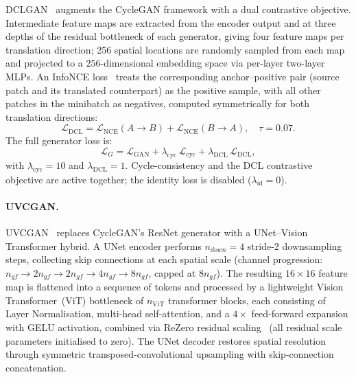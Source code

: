DCLGAN~\cite{han2021dual} augments the CycleGAN framework with a dual contrastive
objective.
Intermediate feature maps are extracted from the encoder output and at three depths of
the residual bottleneck of each generator, giving four feature maps per translation
direction; 256 spatial locations are randomly sampled from each map and projected to a
$256$-dimensional embedding space via per-layer two-layer MLPs.
An InfoNCE loss~\cite{oord2018representation} treats the corresponding anchor--positive
pair (source patch and its translated counterpart) as the positive sample, with all
other patches in the minibatch as negatives, computed symmetrically for both translation
directions:
\begin{equation}
  \mathcal{L}_{\text{DCL}} =
    \mathcal{L}_{\text{NCE}}(A{\to}B) + \mathcal{L}_{\text{NCE}}(B{\to}A),
    \quad \tau{=}0.07.
\end{equation}
The full generator loss is:
\begin{equation}
  \mathcal{L}_G = \mathcal{L}_{\text{GAN}} +
    \lambda_{\text{cyc}}\,\mathcal{L}_{\text{cyc}} +
    \lambda_{\text{DCL}}\,\mathcal{L}_{\text{DCL}},
\end{equation}
with $\lambda_{\text{cyc}}{=}10$ and $\lambda_{\text{DCL}}{=}1$.
Cycle-consistency and the DCL contrastive objective are active together; the
identity loss is disabled ($\lambda_{\text{id}}{=}0$).

\paragraph{UVCGAN.}
\label{sec:supp-uvcgan}

UVCGAN~\cite{torbunov2022uvcgan} replaces CycleGAN's ResNet generator with a
UNet--Vision Transformer hybrid.
A UNet encoder performs $n_{down}{=}4$ stride-2 downsampling steps, collecting skip
connections at each spatial scale (channel progression:
$n_{gf} \to 2n_{gf} \to 2n_{gf} \to 4n_{gf} \to 8n_{gf}$, capped at $8n_{gf}$).
The resulting $16{\times}16$ feature map is flattened into a sequence of tokens and
processed by a lightweight Vision Transformer~(ViT) bottleneck of $n_{\text{ViT}}$
transformer blocks, each consisting of Layer Normalisation, multi-head self-attention,
and a $4{\times}$ feed-forward expansion with GELU activation, combined via ReZero
residual scaling~\cite{bachlechner2021rezero} (all residual scale parameters initialised
to zero).
The UNet decoder restores spatial resolution through symmetric transposed-convolutional
upsampling with skip-connection concatenation.

